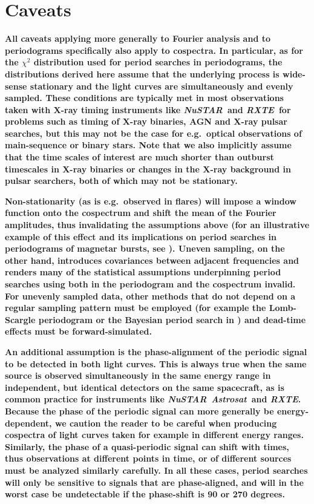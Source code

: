 \documentclass[12pt]{emulateapj}
\newcommand{\project}[1]{\textsl{#1}}
\newcommand{\nustar}{\project{NuSTAR}\xspace}
\newcommand{\rxte}{\project{RXTE}\xspace}
\newcommand{\astrosat}{\project{Astrosat}\xspace}
\begin{document}
\section{\textbf{Caveats}}

\textbf{All caveats applying more generally to Fourier analysis and to periodograms specifically also apply to cospectra. In particular, as for the $\chi^2$ distribution used for period searches in periodograms, the distributions derived here assume that the underlying process is wide-sense stationary and the light curves are simultaneously and evenly sampled. These conditions are typically met in most observations taken with X-ray timing instruments like \nustar\ and \rxte\ for problems such as timing of X-ray binaries, AGN and X-ray pulsar searches, but this may not be the case for e.g.\ optical observations of main-sequence or binary stars. Note that we also implicitly assume that the time scales of interest are much shorter than outburst timescales in X-ray binaries or changes in the X-ray background in pulsar searchers, both of which may not be stationary.}

\textbf{Non-stationarity (as is e.g.\ observed in flares) will impose a window function onto the cospectrum and shift the mean of the Fourier amplitudes, thus invalidating the assumptions above (for an illustrative example of this effect and its implications on period searches in periodograms of magnetar bursts, see \citealt{huppenkothen2013}). Uneven sampling, on the other hand, introduces covariances between adjacent frequencies and renders many of the statistical assumptions underpinning period searches using both in the periodogram and the cospectrum invalid. For unevenly sampled data, other methods that do not depend on a regular sampling pattern must be employed (for example the Lomb-Scargle periodogram \citep{lomb1976, scargle1982} or the Bayesian period search in \citet{gregory1992}) and dead-time effects must be forward-simulated.}

\textbf{An additional assumption is the phase-alignment of the periodic signal to be detected in both light curves. This is always true when the same source is observed simultaneously in the same energy range in independent, but identical detectors on the same spacecraft, as is common practice for instruments like \nustar\, \astrosat\ and \rxte. Because the phase of the periodic signal can more generally be energy-dependent, we caution the reader to be careful when producing cospectra of light curves taken for example in different energy ranges. Similarly, the phase of a quasi-periodic signal can shift with times, thus observations at different points in time, or of different sources must be analyzed similarly carefully. In all these cases, period searches will only be sensitive to signals that are phase-aligned, and will in the worst case be undetectable if the phase-shift is 90 or 270 degrees. }
\end{document}
